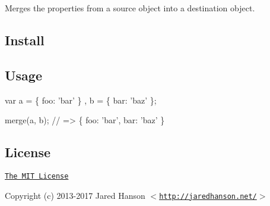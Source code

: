 \href{https://www.npmjs.com/package/utils-merge}{\tt } \href{https://travis-ci.org/jaredhanson/utils-merge}{\tt } \href{https://codeclimate.com/github/jaredhanson/utils-merge}{\tt } \href{https://coveralls.io/r/jaredhanson/utils-merge}{\tt } \href{https://david-dm.org/jaredhanson/utils-merge}{\tt }

Merges the properties from a source object into a destination object.

\subsection*{Install}




\subsection*{Usage}


\begin{DoxyCode}
var a = \{ foo: 'bar' \}
  , b = \{ bar: 'baz' \};

merge(a, b);
// => \{ foo: 'bar', bar: 'baz' \}
\end{DoxyCode}


\subsection*{License}

\href{http://opensource.org/licenses/MIT}{\tt The M\+IT License}

Copyright (c) 2013-\/2017 Jared Hanson $<$\href{http://jaredhanson.net/}{\tt http\+://jaredhanson.\+net/}$>$

\href{https://app.codesponsor.io/link/vK9dyjRnnWsMzzJTQ57fRJpH/jaredhanson/utils-merge}{\tt } 
